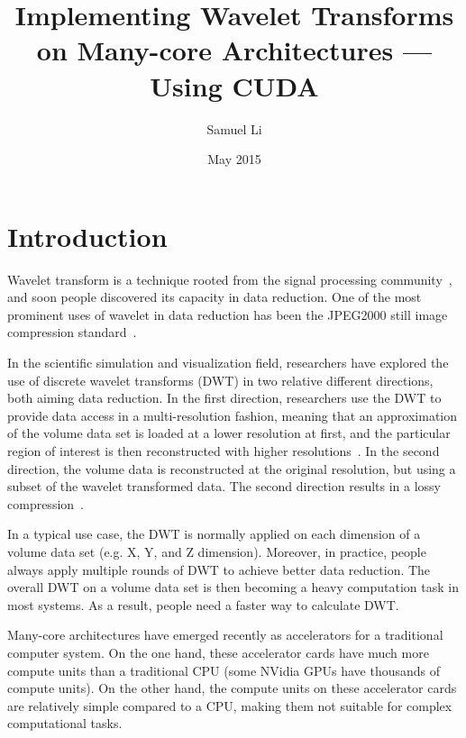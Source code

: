 \documentclass{article}
\title{Implementing Wavelet Transforms on Many-core Architectures ---
        Using CUDA}
\author{Samuel Li}
\date{May 2015}
\begin{document}
\maketitle


\section{Introduction}
\label{sec:intro}
%
Wavelet transform is a technique rooted from the signal processing 
community~\cite{daubechies1990wavelet, mallat1999wavelet},
and soon people discovered its capacity in data reduction.
%
One of the most prominent uses of wavelet in data reduction has been
the JPEG2000 still image compression
standard~\cite{adams2001jpeg,usevitch2001tutorial}. 

In the scientific simulation and visualization field, researchers have
explored the use of discrete wavelet transforms (DWT) in two 
relative different directions, both aiming data reduction.
%
In the first direction, researchers use the DWT to provide data access
in a multi-resolution fashion, meaning that an approximation of the volume data
set is loaded at a lower resolution at first, and the particular region of interest
is then reconstructed with higher resolutions~\cite{mallat1989theory,
kanai1998digital, baldwin2003multi}.
%
In the second direction, the volume data is reconstructed at the 
original resolution, but using a subset of the wavelet transformed 
data.
%
The second direction results in a lossy compression~\cite{bethel2012high,
norton2012vapor}.

In a typical use case, the DWT is normally applied on each dimension of a
volume data set (e.g. X, Y, and Z dimension). 
%
Moreover, in practice, people always apply multiple rounds of DWT to achieve better
data reduction. 
%
The overall DWT on a volume data set is then becoming a heavy computation
task in most systems.
%
As a result, people need a faster way to calculate DWT. 

Many-core architectures have emerged recently as accelerators for a 
traditional computer system.
%
On the one hand, these accelerator cards have much more compute units 
than a traditional CPU (some NVidia GPUs have thousands of compute units).
%
On the other hand, the compute units on these accelerator cards are 
relatively simple compared to a CPU, making them not suitable for complex 
computational tasks.
\end{document}
